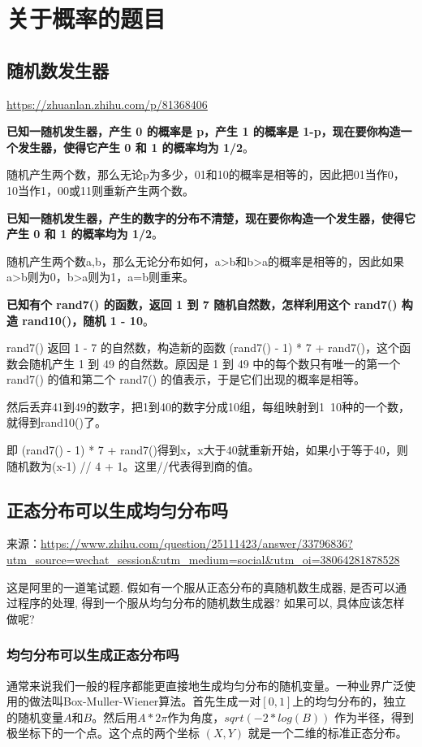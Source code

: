 \documentclass[12pt]{article}
\begin{document}
\section{关于概率的题目}
\subsection{随机数发生器}
\url{https://zhuanlan.zhihu.com/p/81368406}

\textbf{已知一随机发生器，产生 0 的概率是 p，产生 1 的概率是 1-p，现在要你构造一个发生器，使得它产生 0 和 1 的概率均为 1/2}。

随机产生两个数，那么无论p为多少，01和10的概率是相等的，因此把01当作0，10当作1，00或11则重新产生两个数。

\textbf{已知一随机发生器，产生的数字的分布不清楚，现在要你构造一个发生器，使得它产生 0 和 1 的概率均为 1/2}。

随机产生两个数a,b，那么无论分布如何，a>b和b>a的概率是相等的，因此如果a>b则为0，b>a则为1，a=b则重来。

\textbf{已知有个 rand7() 的函数，返回 1 到 7 随机自然数，怎样利用这个 rand7() 构造 rand10()，随机 1 - 10}。

rand7() 返回 1 - 7 的自然数，构造新的函数 (rand7() - 1) * 7 + rand7()，这个函数会随机产生 1 到 49 的自然数。原因是 1 到 49 中的每个数只有唯一的第一个 rand7() 的值和第二个 rand7() 的值表示，于是它们出现的概率是相等。

然后丢弃41到49的数字，把1到40的数字分成10组，每组映射到1~10种的一个数，就得到rand10()了。

即 (rand7() - 1) * 7 + rand7()得到x，x大于40就重新开始，如果小于等于40，则随机数为(x-1) // 4 + 1。这里//代表得到商的值。

\subsection{正态分布可以生成均匀分布吗}
来源：\url{https://www.zhihu.com/question/25111423/answer/33796836?utm_source=wechat_session&utm_medium=social&utm_oi=38064281878528}

这是阿里的一道笔试题. 假如有一个服从正态分布的真随机数生成器, 是否可以通过程序的处理, 得到一个服从均匀分布的随机数生成器? 如果可以, 具体应该怎样做呢? 

\subsubsection{均匀分布可以生成正态分布吗}
通常来说我们一般的程序都能更直接地生成均匀分布的随机变量。一种业界广泛使用的做法叫Box-Muller-Wiener算法。首先生成一对$[0,1]$上的均匀分布的，独立的随机变量$A$和$B$。然后用$A *2\pi $作为角度，$sqrt(-2*log(B))$ 作为半径，得到极坐标下的一个点。这个点的两个坐标 $(X,Y)$ 就是一个二维的标准正态分布。
\end{document}
